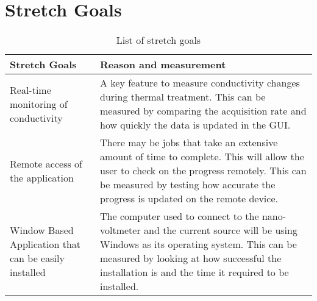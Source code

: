 \documentclass[12pt, titlepage]{article}
\begin{document}
\section{Stretch Goals} %
\begin{table}[h!]
    \centering
    \begin{tabular}{p{} p{}}
    
    \toprule
    \textbf{Stretch Goals} & \textbf{Reason and measurement}\\
   
    \midrule{Real-time monitoring of conductivity} & A key feature to measure conductivity changes during thermal treatment. This can be measured by comparing the acquisition rate and how quickly the data is updated in the GUI. \\
    \midrule{Remote access of the application} & There may be jobs that take an extensive amount of time to complete. This will allow the user to check on the progress remotely. This can be measured by testing how accurate the progress is updated on the remote device. \\
    \midrule{Window Based Application that can be easily installed} & The computer used to connect to the nano-voltmeter and the current source will be using Windows as its operating system. This can be measured by looking at how successful the installation is and the time it required to be installed. \\
    
    \bottomrule
    
    \end{tabular}
    \caption{List of stretch goals}
\end{table}
\end{document}
